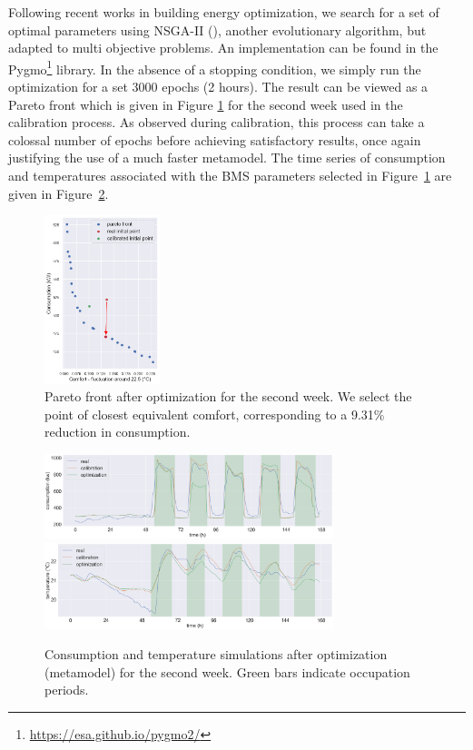 \documentclass[12pt]{article}
\begin{document}
Following recent works in building energy optimization, we search for a set of optimal parameters using NSGA-II (\cite{Deb2000AFE}), another evolutionary algorithm, but adapted to multi objective problems. An implementation can be found in the Pygmo\footnote{\href{https://esa.github.io/pygmo2/}{https://esa.github.io/pygmo2/}} library. In the absence of a stopping condition, we simply run the optimization for a set 3000 epochs (2 hours). The result can be viewed as a Pareto front which is given in Figure \ref{fig:pareto} for the second week used in the calibration process. As observed during calibration, this process can take a colossal number of epochs before achieving satisfactory results, once again justifying the use of a much faster metamodel. The time series of consumption and temperatures associated with the BMS parameters selected in Figure~\ref{fig:pareto} are given in Figure~\ref{fig:timeseriesafteroptim}.

\begin{figure}
    \centering
    \includegraphics[width=0.3\textwidth]{pareto_week2.png}
    \caption{Pareto front after optimization for the second week. We select the point of closest equivalent comfort, corresponding to a 9.31\% reduction in consumption.}
    \label{fig:pareto}
\end{figure}


\begin{figure}
    \centering
    \includegraphics[width=0.75\textwidth]{optim_week2_private.png}
    \includegraphics[width=0.75\textwidth]{optim_week2_t_int.png}
    \caption{Consumption and temperature simulations after optimization (metamodel) for the second week. Green bars indicate occupation periods.} %
    \label{fig:timeseriesafteroptim}
\end{figure}
\end{document}
